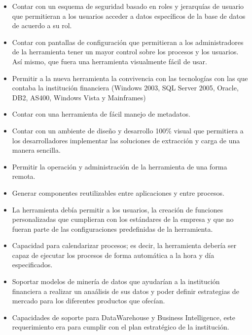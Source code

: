\begin{itemize}
\item Contar con un esquema de seguridad basado en roles y jerarquías de usuario
  que permitieran a los usuarios acceder a datos específicos de la base de datos
  de acuerdo a su rol.

\item Contar con pantallas de configuración que permitieran a los
  administradores de la herramienta tener un mayor control sobre los procesos y
  los usuarios. Así mismo, que fuera una herramienta visualmente fácil de usar.

\item Permitir a la nueva herramienta la convivencia con las tecnologías con las
  que contaba la institución financiera (Windows 2003, SQL Server 2005, Oracle,
  DB2, AS400, Windows Vista y Mainframes)

\item Contar con una herramienta de fácil manejo de metadatos.

\item Contar con un ambiente de diseño y desarrollo 100\% visual que permitiera
  a los desarrolladores implementar las soluciones de extracción y carga de una
  manera sencilla.

\item Permitir la operación y administración de la herramienta de una forma
  remota.

\item Generar componentes reutilizables entre aplicaciones y entre procesos.

\item La herramienta debía permitir a los usuarios, la creación de funciones
  personalizadas que cumplieran con los estándares de la empresa y que no fueran
  parte de las configuraciones predefinidas de la herramienta.

\item Capacidad para calendarizar procesos; es decir, la herramienta debería ser
  capaz de ejecutar los procesos de forma automática a la hora y día
  especificados.

\item Soportar modelos de minería de datos que ayudarían a la institución
  financiera a realizar un anaálisis de sus datos y poder definir estrategias de
  mercado para los diferentes productos que ofecían.

\item Capacidades de soporte para DataWarehouse y Business Intelligence, este
  requerimiento era para cumplir con el plan estratégico de la institución.


\end{itemize}
